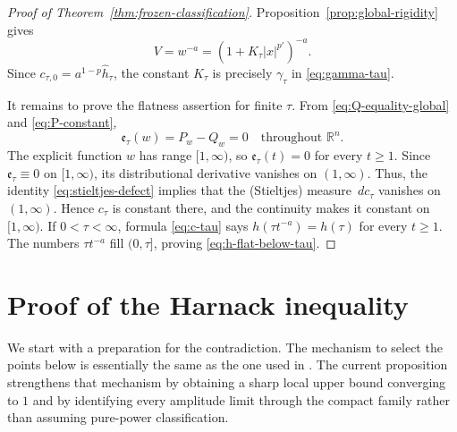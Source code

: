\documentclass[reqno,12pt]{amsart}
\numberwithin{equation}{section}
\theoremstyle{remark}
\newcommand{\R}{\mathbb R}
\newcommand{\dd}{\,d}
\begin{document}
\begin{proof}[Proof of Theorem~\ref{thm:frozen-classification}]
Proposition~\ref{prop:global-rigidity} gives
$$
 V=w^{-a}
   =\left(1+K_\tau|x|^{p'}\right)^{-a}.
$$
Since $c_{\tau,0}=a^{1-p}\widehat h_\tau$, the constant
$K_\tau$ is precisely $\gamma_\tau$ in \eqref{eq:gamma-tau}.

It remains to prove the flatness assertion for finite $\tau$.  From
\eqref{eq:Q-equality-global} and \eqref{eq:P-constant},
$$
\mathfrak e_\tau(w)=P_w-Q_w=0
\quad\text{throughout }\R^n.
$$
The explicit function $w$ has range $[1,\infty)$, so
$\mathfrak e_\tau(t)=0$ for every $t\ge1$.  Since $\mathfrak e_\tau\equiv0 $ on $[1,\infty)$, its distributional derivative vanishes on $(1,\infty)$.
Thus, the identity \eqref{eq:stieltjes-defect}
implies that the (Stieltjes) measure $\dd c_\tau$ vanishes on $(1,\infty)$.
Hence $c_\tau$ is constant there, and the continuity makes it
constant on $[1,\infty)$. If
$0<\tau<\infty$, formula \eqref{eq:c-tau} says
$h(\tau t^{-a})=h(\tau)$ for every $t\ge1$.  The numbers
$\tau t^{-a}$ fill $(0,\tau]$, proving \eqref{eq:h-flat-below-tau}.
\end{proof}


 
\section{Proof of the Harnack inequality}

We start with a preparation for the contradiction. The mechanism to select the points below is essentially the same as the one
used in \cite[(4.1)--(4.6)]{QZ2026}. The current proposition strengthens that mechanism by obtaining a sharp local upper bound converging to $1$ and by identifying every amplitude limit through the compact family rather than assuming pure-power classification.
\end{document}
